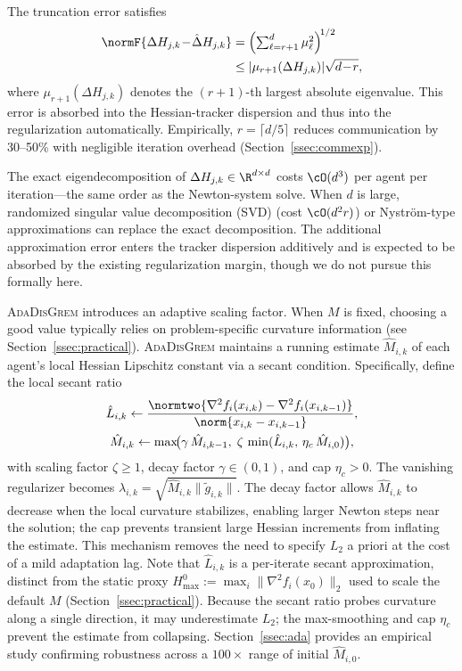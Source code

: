 \documentclass[review,onefignum,onetabnum]{siamart171218}
\begin{document}
	The truncation error satisfies
	\begin{align*}
		\normF{\Delta H_{j,k}\!-\!\hat\Delta H_{j,k}}
		&=\Bigl(\textstyle\sum_{\ell=r+1}^d \mu_\ell^2\Bigr)^{\!1/2}\\
		&\le |\mu_{r+1}(\Delta H_{j,k})|\sqrt{d\!-\!r},
	\end{align*}
	where $\mu_{r+1}(\Delta H_{j,k})$ denotes the $(r+1)$-th largest absolute eigenvalue.
	This error is absorbed into the Hessian-tracker dispersion and thus into the regularization automatically.
	Empirically, $r=\lceil d/5\rceil$ reduces communication by 30--50\% with negligible iteration overhead
	(Section~\ref{ssec:commexp}).
	
	\begin{remark}
		The exact eigendecomposition of $\Delta H_{j,k}\in\R^{d\times d}$
		costs $\cO(d^3)$ per agent per iteration---the same order as the
		Newton-system solve.
		When $d$ is large, randomized singular value decomposition (SVD)
		(cost $\cO(d^2 r)$) or Nystr\"om-type approximations can replace
		the exact decomposition.
		The additional approximation error enters the tracker dispersion
		additively and is expected to be absorbed by the existing
		regularization margin, though we do not pursue this formally here.
	\end{remark}
	
	\textsc{AdaDisGrem} introduces an adaptive scaling factor.
	When $M$ is fixed, choosing a good value typically relies on
	problem-specific curvature information (see Section~\ref{ssec:practical}).
	\textsc{AdaDisGrem} maintains a running estimate $\hat M_{i,k}$ of
	each agent's local Hessian Lipschitz constant via a secant condition.
	Specifically, define the local secant ratio
	\begin{gather*}
		\hat L_{i,k}\gets
		\frac{\normtwo{\nabla^2 f_i(x_{i,k})-\nabla^2 f_i(x_{i,k-1})}}
		{\norm{x_{i,k}-x_{i,k-1}}},\\
		\hat M_{i,k}\gets \max\!\bigl(\gamma\,\hat M_{i,k-1},\;
		\zeta\,\min(\hat L_{i,k},\,\eta_c\,\hat M_{i,0})\bigr),
	\end{gather*}
	with scaling factor $\zeta\ge 1$, decay factor $\gamma\in(0,1)$, and cap $\eta_c>0$.
	The vanishing regularizer becomes $\lambda_{i,k}=\sqrt{\hat M_{i,k}\|\tilde g_{i,k}\|}$.
	The decay factor allows $\hat M_{i,k}$ to decrease when the local
	curvature stabilizes, enabling larger Newton steps near the solution;
	the cap prevents transient large Hessian increments from inflating
	the estimate.
	This mechanism removes the need to specify $L_2$ a priori
	at the cost of a mild adaptation lag.
	Note that $\hat L_{i,k}$ is a per-iterate secant
	approximation, distinct from the static proxy
	$H_{\max}^0 := \max_i\|\nabla^2 f_i(x_0)\|_2$ used to
	scale the default $M$ (Section~\ref{ssec:practical}).
	Because the secant ratio probes curvature along a single
	direction, it may underestimate $L_2$;
	the max-smoothing and cap $\eta_c$ prevent the estimate
	from collapsing.
	Section~\ref{ssec:ada} provides an empirical study
	confirming robustness across a $100\times$ range of initial
	$\hat M_{i,0}$.
	
\end{document}
